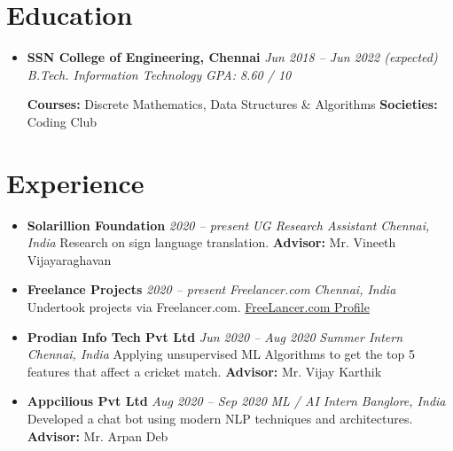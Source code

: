 \documentclass[letterpaper,10pt]{article}
\newcommand{\name}{M Badri Narayanan}
\newenvironment{cvitemize}{
    \begin{itemize}[leftmargin=10pt,label={},afterlabel={},after=\vspace{-12pt}]
}{
    \end{itemize}
}
\newcommand{\eduitem}[5]{
    \item{
        \textbf{#1} \hfill \textit{#2} \newline
        \textit{#3} \hfill \textit{#4} \newline
        #5
    }
}
\newcommand{\point}{\raisebox{0.1\height}{$\rightarrow$}\hspace{4pt}}
\newcommand{\expitem}[6]{
    \item{
        \textbf{#1} \hfill \textit{#2} \newline
        \textit{#3} \hfill \textit{#4} \newline
        \point #5 \newline
        #6
    }
}
\newcommand{\me}{\uline{\name}}
\newcommand{\pubitem}[5]{
    \item{
        \textit{#1} \hfill #5 \newline
        #2 \newline
        \textit{#3}
        \ifthenelse{\isempty{#4}}
            {}
            {\newline #4}
    }
}
\begin{document}
\section*{Education}
\begin{cvitemize}
    \eduitem{SSN College of Engineering, Chennai}{Jun 2018 -- Jun 2022 (expected)}{B.Tech. Information Technology}{GPA: 8.60 / 10 }{
        \textbf{Courses:} Discrete Mathematics, Data Structures \& Algorithms\newline
        \textbf{Societies:} Coding Club
    }
\end{cvitemize}

\section*{Experience}
\begin{cvitemize}
    \expitem{Solarillion Foundation}{2020 -- present}{UG Research Assistant}{Chennai, India}{Research on sign language translation.}{\textbf{Advisor:} Mr. Vineeth Vijayaraghavan}
    \expitem{Freelance Projects}{2020 -- present}{Freelancer.com}{Chennai, India}{Undertook projects via Freelancer.com.}{\href{https://www.freelancer.in/u/HalceyonAI}{FreeLancer.com Profile}}
    \expitem{Prodian Info Tech Pvt Ltd}{Jun 2020 -- Aug 2020}{Summer Intern}{Chennai, India}{Applying unsupervised ML Algorithms to get the top 5 features that affect a cricket match.}{\textbf{Advisor:} Mr. Vijay Karthik}
    \expitem{Appcilious Pvt Ltd}{Aug 2020 -- Sep 2020}{ML / AI Intern}{Banglore, India}{Developed a chat bot using modern NLP techniques and architectures.}{\textbf{Advisor:} Mr. Arpan Deb}
\end{cvitemize}

\end{document}
